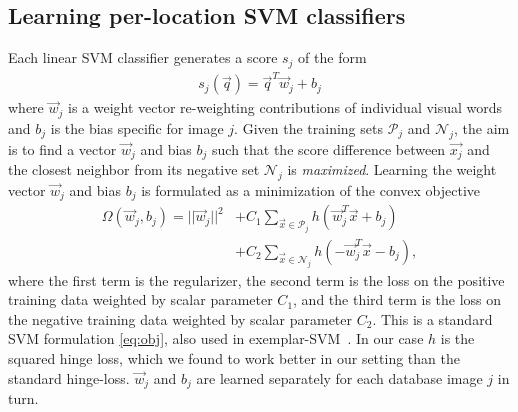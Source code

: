    \subsection{Learning per-location SVM classifiers }
      Each linear SVM classifier
      \textcolor{petr}{generates} a score $s_j$ of the form 
      \begin{align}
        s_j(\vec{q})=\vec{q}^T \vec{w}_j+b_j
        \label{eq:linear}
      \end{align}
      \noindent
      where $\vec{w}_j$ is a weight vector re-weighting contributions of individual visual words and $b_j$ is the bias specific for image $j$. Given the training sets $\mathcal P_j$ and $\mathcal N_j$, the aim is to find a vector $\vec{w}_j$ and bias $b_j$ such that the score difference between $\vec{x_j}$ and the closest neighbor from its negative set $\mathcal N_j$ is {\em maximized}. %
      Learning the weight vector $\vec{w}_j$ and bias $b_j$ is formulated as a minimization of the convex objective 
      \begin{align}
        \nonumber
        \Omega(\vec{w}_j,b_j)=||\vec{w}_j||^{2}& +C_1\sum_{\vec{x}\in \mathcal P_j}h(\vec{w}_j^T\vec{x}+b_j)   \\
        \label{eq:obj}
                           & +C_2\sum_{\vec{x}\in \mathcal N_j}h(-\vec{w}_j^T\vec{x}-b_j), 
      \end{align}
      \noindent
      where the first term is the regularizer, the second term is the loss on the positive training data weighted by scalar parameter $C_1$, and the third term is the loss on the negative training data weighted by scalar parameter $C_2$.   
      This is a standard SVM formulation \eqref{eq:obj}, also used in exemplar-SVM~\cite{Malisiewicz11}.
      In our case $h$ is the squared hinge loss, which we found to work better in our setting than the standard hinge-loss. $\vec{w}_j$ and $b_j$ are learned separately for each database image $j$ in turn. 
     
